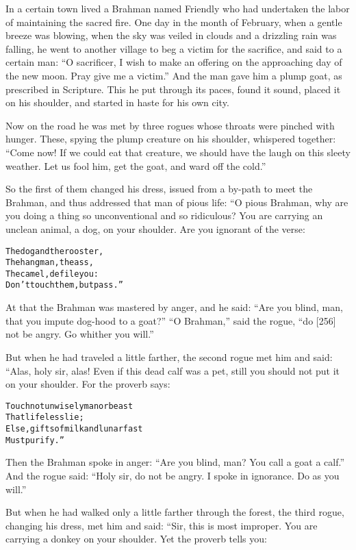 \documentclass{article}
\renewenvironment{verbatim}{\begin{alltt}\normalfont\begin{centering}}{\end{centering}\end{alltt}}
\begin{document}
In a certain town lived a Brahman named Friendly who had undertaken
the labor of maintaining the sacred fire. One day in the month of
February, when a gentle breeze was blowing, when the sky was veiled
in clouds and a drizzling rain was falling, he went to another
village to beg a victim for the sacrifice, and said to a certain
man:
``O sacrificer, I wish to make an offering on the approaching day of the new moon. Pray give me a victim.''
And the man gave him a plump goat, as prescribed in Scripture. This
he put through its paces, found it sound, placed it on his
shoulder, and started in haste for his own city.

Now on the road he was met by three rogues whose throats were
pinched with hunger. These, spying the plump creature on his
shoulder, whispered together:
``Come now! If we could eat that creature, we should have the laugh on this sleety weather. Let us fool him, get the goat, and ward off the cold.''

So the first of them changed his dress, issued from a by-path to
meet the Brahman, and thus addressed that man of pious life: “O
pious Brahman, why are you doing a thing so unconventional and so
ridiculous? You are carrying an unclean animal, a dog, on your
shoulder. Are you ignorant of the verse:

\begin{verbatim}
The dog and the rooster,
The hangman, the ass,
The camel, defile you:
Don't touch them, but pass.”
\end{verbatim}
At that the Brahman was mastered by anger, and he said:
``Are you blind, man, that you impute dog-hood to a goat?''
``O Brahman,'' said the rogue,
``do [256] not be angry. Go whither you will.''

But when he had traveled a little farther, the second rogue met him
and said: “Alas, holy sir, alas! Even if this dead calf was a pet,
still you should not put it on your shoulder. For the proverb
says:

\begin{verbatim}
Touch not unwisely man or beast
    That lifeless lie;
Else, gifts of milk and lunar fast
    Must purify.”
\end{verbatim}
Then the Brahman spoke in anger:
``Are you blind, man? You call a goat a calf.'' And the rogue said:
``Holy sir, do not be angry. I spoke in ignorance. Do as you will.''

But when he had walked only a little farther through the forest,
the third rogue, changing his dress, met him and said: “Sir, this
is most improper. You are carrying a donkey on your shoulder. Yet
the proverb tells you:
\end{document}
